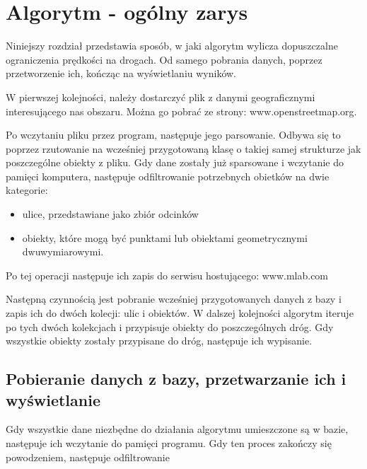 \chapter{Algorytm - ogólny zarys}
\label{cha:ogolnyzarys}
Niniejszy rozdział przedstawia sposób, w jaki algorytm wylicza dopuszczalne ograniczenia prędkości na drogach. Od samego pobrania danych, poprzez przetworzenie ich, kończąc na wyświetlaniu wyników. 

W pierwszej kolejności, należy dostarczyć plik z danymi geograficznymi interesującego nas obszaru. Można go pobrać ze strony: www.openstreetmap.org.  

Po wczytaniu pliku przez program, następuje jego parsowanie. Odbywa się to poprzez rzutowanie na wcześniej przygotowaną klasę o takiej samej strukturze jak poszczególne obiekty z pliku. Gdy dane zostały już sparsowane i wczytanie do pamięci komputera, następuje odfiltrowanie potrzebnych obietków na dwie kategorie:
\begin{itemize}
\item ulice, przedstawiane jako zbiór odcinków
\item obiekty, które mogą być punktami lub obiektami geometrycznymi dwuwymiarowymi.
\end{itemize}
Po tej operacji następuje ich zapis do serwisu hostującego: www.mlab.com


Następną czynnością jest pobranie wcześniej przygotowanych danych z bazy i zapis ich do dwóch kolecji: ulic i obiektów. W dalszej kolejności algorytm iteruje po tych dwóch kolekcjach i przypisuje obiekty do poszczególnych dróg. Gdy wszystkie obiekty zostały przypisane do dróg, następuje ich wypisanie.

\newpage
\section{Pobieranie danych z bazy, przetwarzanie ich i wyświetlanie}
Gdy wszystkie dane niezbędne do działania algorytmu umieszczone są w bazie, następuje ich wczytanie do pamięci programu. Gdy ten proces zakończy się powodzeniem, następuje odfiltrowanie 